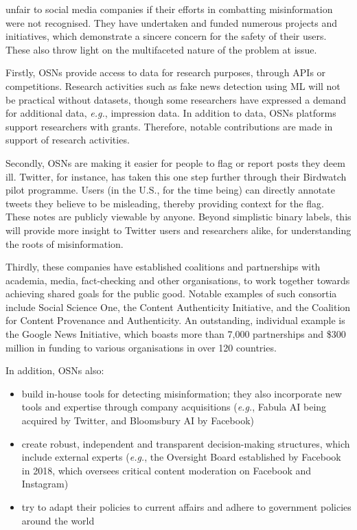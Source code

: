  unfair to social media companies if their efforts in combatting misinformation were not recognised. They have undertaken and funded numerous projects and initiatives, which demonstrate a sincere concern for the safety of their users. These also throw light on the multifaceted nature of the problem at issue.

Firstly, \acp{OSN} provide access to data for research purposes, through APIs or competitions. Research activities such as fake news detection using \ac{ML} will not be practical without datasets, though some researchers have expressed a demand for additional data, \emph{e.g.}, impression data. In addition to data, \acp{OSN} platforms support researchers with grants. Therefore, notable contributions are made in support of research activities.

Secondly, \acp{OSN} are making it easier for people to flag or report posts they deem ill. Twitter, for instance, has taken this one step further through their Birdwatch pilot programme. Users (in the U.S., for the time being) can directly annotate tweets they believe to be misleading, thereby providing context for the flag. These notes are publicly viewable by anyone. Beyond simplistic binary labels, this will provide more insight to Twitter users and researchers alike, for understanding the roots of misinformation.

Thirdly, these companies have established coalitions and partnerships with academia, media, fact-checking and other organisations, to work together towards achieving shared goals for the public good. Notable examples of such consortia include Social Science One, the Content Authenticity Initiative, and the Coalition for Content Provenance and Authenticity. An outstanding, individual example is the Google News Initiative, which boasts more than 7,000 partnerships and \$300 million in funding to various organisations in over 120 countries.

In addition, \acp{OSN} also:

\begin{itemize}
    \item build in-house tools for detecting misinformation; they also incorporate new tools and expertise through company acquisitions (\emph{e.g.}, Fabula AI being acquired by Twitter, and Bloomsbury AI by Facebook)
    \item create robust, independent and transparent decision-making structures, which include external experts (\emph{e.g.}, the Oversight Board established by Facebook in 2018, which oversees critical content moderation on Facebook and Instagram)
    \item try to adapt their policies to current affairs and adhere to government policies around the world
\end{itemize}

